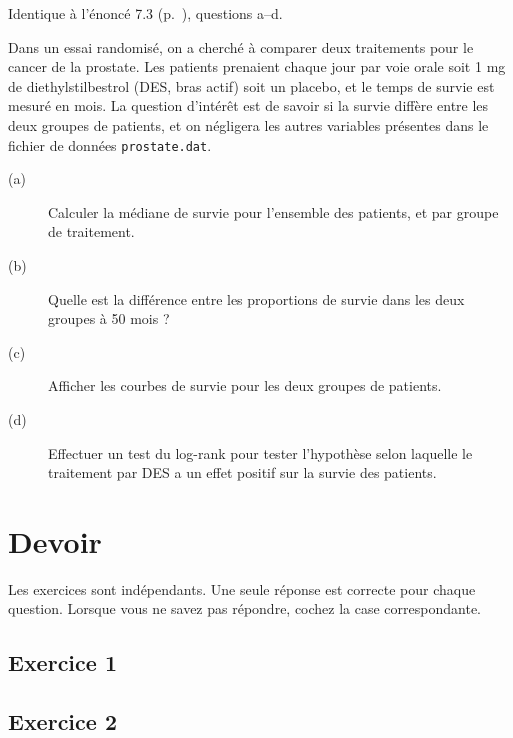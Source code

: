 \begin{exo}\label{exo:11.2}
{\footnotesize Identique à l'énoncé 7.3 (p.~\pageref{exo:7.3}), questions
  a–d}.

Dans un essai randomisé, on a cherché à comparer deux traitements pour le
cancer de la prostate. Les patients prenaient chaque jour par voie orale
soit 1 mg de diethylstilbestrol (DES, bras actif) soit un placebo, et le
temps de survie est mesuré en mois.\autocite{collett94} La question
d'intérêt est de savoir si la survie diffère entre les deux groupes de
patients, et on négligera les autres variables présentes dans le fichier de
données \texttt{prostate.dat}. 
\begin{description}
\item[(a)] Calculer la médiane de survie pour l'ensemble des patients, et
  par groupe de traitement.
\item[(b)] Quelle est la différence entre les proportions de survie dans les
  deux groupes à 50 mois ?
\item[(c)] Afficher les courbes de survie pour les deux groupes de patients.
\item[(d)] Effectuer un test du log-rank pour tester l'hypothèse selon
  laquelle le traitement par DES a un effet positif sur la survie des
  patients. 
\end{description}
\end{exo}

\chapter*{Devoir }

Les exercices sont indépendants. Une seule réponse est correcte pour chaque
question. Lorsque vous ne savez pas répondre, cochez la case correspondante.

\section*{Exercice 1}

\section*{Exercice 2}
